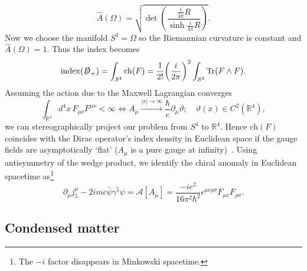 \documentclass[11pt, a4paper]{article}
\begin{document}
\begin{equation}
  \hat{A}(\Omega) = \sqrt{ \det{\left( \frac{ \frac{i}{4\pi}R }{ \sinh{\frac{i}{4\pi}R} } \right) } }. 
\end{equation}
Now we choose the manifold $S^{4} = \Omega$ so the Riemannian curvature is 
constant and $\hat{A}(\Omega) = 1$. Thus the index becomes
\begin{equation}
  \mathrm{index}(\slashed{D}_+ ) =  \int_{S^4}{\mathrm{ch}(F)}
  = \frac{1}{2!}{\left(\frac{i}{2\pi}\right)}^2 \int_{S^4}{\mathrm{Tr}(F \wedge F)}.
\end{equation}
Assuming the action due to the Maxwell Lagrangian converges
\begin{equation}\label{eq:8}
  \int_{\mathbb{R}^4}{d^4x\, F_{\mu\nu}F^{\mu\nu}} < \infty \iff 
  A_\mu \xrightarrow{|x| \rightarrow \infty} \frac{\hbar}{e}\partial_{\mu}\vartheta;
  \quad \vartheta(x)\in C^2(\mathbb{R}^4),
\end{equation}
we can stereographically project our problem from $S^4$ to $\mathbb{R}^4$.
Hence $\mathrm{ch}(F)$ coincides with the Dirac operator's
index density in Euclidean space if the gauge fields
are asymptotically `flat' ($A_\mu$ is a pure gauge at infinity)~\cite{JackiwRebbi1977,Belavin}.
Using antisymmetry of the wedge product, we identify the
chiral anomaly in Euclidean spacetime as\footnote{The $-i$ factor disappears in Minkowski spacetime.} 
\begin{equation}
  \partial_\mu j^\mu_5 - 2imc\bar{\psi}\gamma^5\psi =
  \mathcal{A}[A_\mu] = \frac{-ie^2}{16\pi^2\hbar^2}
  \epsilon^{\mu\nu\rho\sigma} F_{\mu\nu}F_{\rho\sigma}.
\end{equation}


\subsection{Condensed matter}
\end{document}

